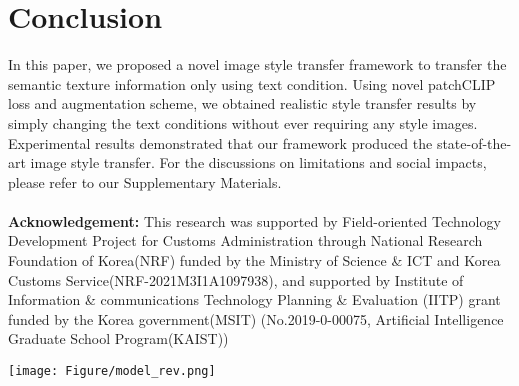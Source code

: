\documentclass[10pt,twocolumn,letterpaper]{article}
\begin{document}
\section{Conclusion}

In this paper, we proposed a novel image style transfer framework to transfer the semantic texture information only using text condition. 
Using novel  patchCLIP loss and augmentation scheme, we obtained realistic style transfer results by simply changing the text conditions without
ever requiring any style images. 
Experimental results demonstrated that our framework produced the state-of-the-art image style transfer. {For the discussions on limitations and social impacts, please refer to our Supplementary Materials.}
\\
\\
\noindent\textbf{Acknowledgement:} This research was supported by Field-oriented Technology Development Project for Customs Administration through National Research Foundation of Korea(NRF) funded by the Ministry of Science \& ICT and Korea Customs Service(NRF-2021M3I1A1097938), and supported by Institute of Information \& communications Technology Planning \& Evaluation (IITP) grant funded by the Korea government(MSIT) 
(No.2019-0-00075, Artificial Intelligence Graduate School Program(KAIST))




% 
% 


\begin{figure*}
\centering
\texttt{[image: Figure/model\_rev.png]}
 \vspace*{-0.2cm}
\label{fig:model}
\end{figure*}

\end{document}
